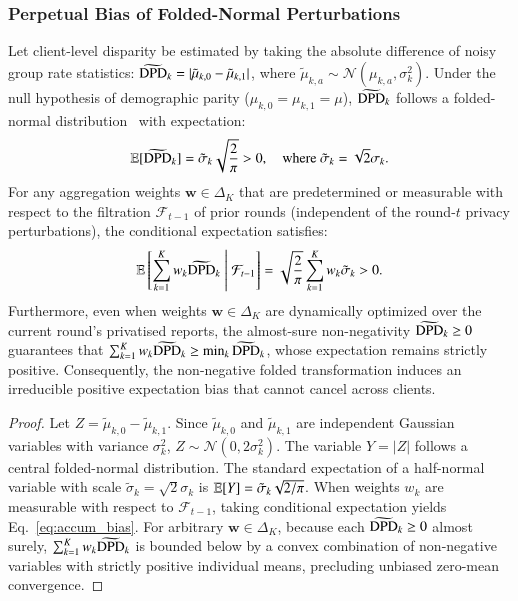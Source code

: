 \subsubsection{Perpetual Bias of Folded-Normal Perturbations}
\label{subsubsec:theory_folded}
\begin{lemma}
\label{lem:folded_normal}
Let client-level disparity be estimated by taking the absolute difference of noisy group rate statistics: $\widetilde{\mathrm{DPD}}_k = |\tilde{\mu}_{k,0} - \tilde{\mu}_{k,1}|$, where $\tilde{\mu}_{k,a} \sim \mathcal{N}(\mu_{k,a}, \sigma_k^2)$. Under the null hypothesis of demographic parity ($\mu_{k,0} = \mu_{k,1} = \mu$), $\widetilde{\mathrm{DPD}}_k$ follows a folded-normal distribution~\citep{leone1961folded} with expectation:
\begin{equation}
\label{eq:folded_exp}
\mathbb{E}[\widetilde{\mathrm{DPD}}_k] = \tilde{\sigma}_k \sqrt{\frac{2}{\pi}} > 0, \quad \text{where } \tilde{\sigma}_k = \sqrt{2}\sigma_k.
\end{equation}
For any aggregation weights $\bm{w} \in \Delta_K$ that are predetermined or measurable with respect to the filtration $\mathcal{F}_{t-1}$ of prior rounds (independent of the round-$t$ privacy perturbations), the conditional expectation satisfies:
\begin{equation}
\label{eq:accum_bias}
\mathbb{E}\left[ \sum_{k=1}^K w_k \widetilde{\mathrm{DPD}}_k \;\middle|\; \mathcal{F}_{t-1} \right] = \sqrt{\frac{2}{\pi}} \sum_{k=1}^K w_k \tilde{\sigma}_k > 0.
\end{equation}
Furthermore, even when weights $\bm{w} \in \Delta_K$ are dynamically optimized over the current round's privatised reports, the almost-sure non-negativity $\widetilde{\mathrm{DPD}}_k \ge 0$ guarantees that $\sum_{k=1}^K w_k \widetilde{\mathrm{DPD}}_k \ge \min_{k} \widetilde{\mathrm{DPD}}_k$, whose expectation remains strictly positive. Consequently, the non-negative folded transformation induces an irreducible positive expectation bias that cannot cancel across clients.
\end{lemma}
\begin{proof}
Let $Z = \tilde{\mu}_{k,0} - \tilde{\mu}_{k,1}$. Since $\tilde{\mu}_{k,0}$ and $\tilde{\mu}_{k,1}$ are independent Gaussian variables with variance $\sigma_k^2$, $Z \sim \mathcal{N}(0, 2\sigma_k^2)$. The variable $Y = |Z|$ follows a central folded-normal distribution. The standard expectation of a half-normal variable with scale $\tilde{\sigma}_k = \sqrt{2}\sigma_k$ is $\mathbb{E}[Y] = \tilde{\sigma}_k \sqrt{2/\pi}$. When weights $w_k$ are measurable with respect to $\mathcal{F}_{t-1}$, taking conditional expectation yields Eq.~\eqref{eq:accum_bias}. For arbitrary $\bm{w} \in \Delta_K$, because each $\widetilde{\mathrm{DPD}}_k \ge 0$ almost surely, $\sum_{k=1}^K w_k \widetilde{\mathrm{DPD}}_k$ is bounded below by a convex combination of non-negative variables with strictly positive individual means, precluding unbiased zero-mean convergence.
\end{proof}

